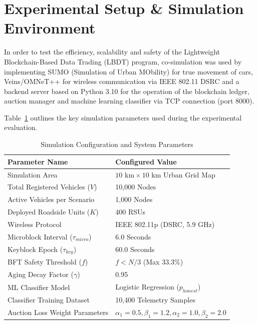 \section{Experimental Setup \& Simulation Environment}\label{sec:results_setup}
\noindent In order to test the efficiency, scalability and safety of the Lightweight Blockchain-Based Data Trading (LBDT) program, co-simulation was used by implementing SUMO (Simulation of Urban MObility) for true movement of cars, Veins/OMNeT++ for wireless communication via IEEE 802.11 DSRC and a backend server based on Python 3.10 for the operation of the blockchain ledger, auction manager and machine learning classifier via TCP connection (port 8000).

Table~\ref{tab:simulation_params} outlines the key simulation parameters used during the experimental evaluation.

\begin{table}[htbp]
\centering
\caption{Simulation Configuration and System Parameters}
\label{tab:simulation_params}
\renewcommand{\arraystretch}{1.3}
\begin{tabular}{|l|l|}
\hline
\textbf{Parameter Name} & \textbf{Configured Value} \\ \hline
Simulation Area & $10 \text{ km} \times 10 \text{ km}$ Urban Grid Map \\ \hline
Total Registered Vehicles ($V$) & 10,000 Nodes \\ \hline
Active Vehicles per Scenario & 1,000 Nodes \\ \hline
Deployed Roadside Units ($K$) & 400 RSUs \\ \hline
Wireless Protocol & IEEE 802.11p (DSRC, 5.9 GHz) \\ \hline
Microblock Interval ($\tau_{micro}$) & 6.0 Seconds \\ \hline
Keyblock Epoch ($\tau_{key}$) & 60.0 Seconds \\ \hline
BFT Safety Threshold ($f$) & $f < N/3$ (Max 33.3\%) \\ \hline
Aging Decay Factor ($\gamma$) & 0.95 \\ \hline
ML Classifier Model & Logistic Regression ($p_{honest}$) \\ \hline
Classifier Training Dataset & 10,400 Telemetry Samples \\ \hline
Auction Loss Weight Parameters & $\alpha_1 = 0.5, \beta_1 = 1.2, \alpha_2 = 1.0, \beta_2 = 2.0$ \\ \hline
\end{tabular}
\end{table}

